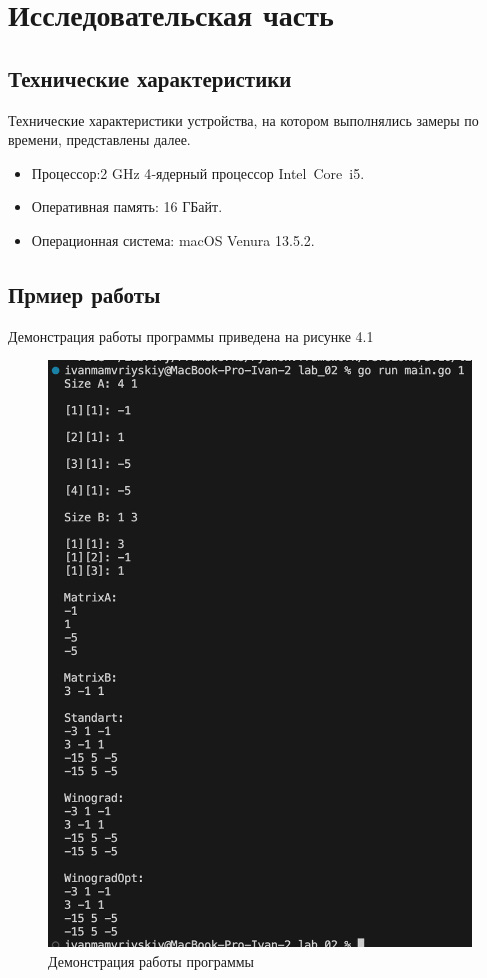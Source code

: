 \chapter{Исследовательская часть}

\section{Технические характеристики}

Технические характеристики устройства, на котором выполнялись замеры по времени, представлены далее.

\begin{itemize}
	\item Процессор:2 GHz 4‑ядерный процессор Intel Core i5.
	\item Оперативная память: 16 ГБайт.
	\item Операционная система: macOS Venura 13.5.2. 
\end{itemize}

\section{Прмиер работы}
Демонстрация работы программы приведена на рисунке 4.1

\begin{figure}[h]
	\centering
	\includegraphics[height=0.4\textheight]{img/example.jpg}
	\caption{Демонстрация работы программы}
	\label{img:demonstration}
\end{figure}

